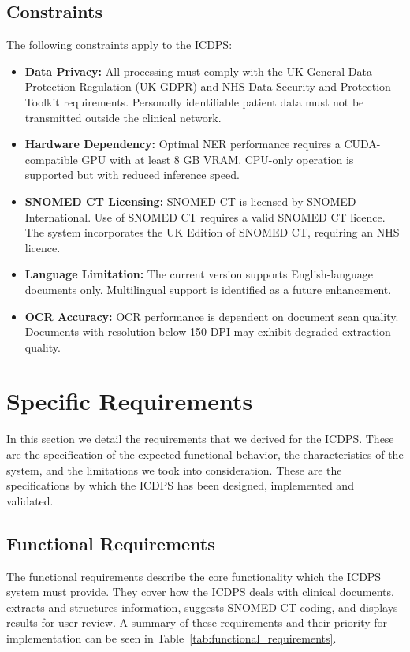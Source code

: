 \subsection{Constraints}
The following constraints apply to the ICDPS:
\begin{itemize}
    \item \textbf{Data Privacy:} All processing must comply with the UK General Data Protection Regulation (UK GDPR) and NHS Data Security and Protection Toolkit requirements. Personally identifiable patient data must not be transmitted outside the clinical network.
    \item \textbf{Hardware Dependency:} Optimal NER performance requires a CUDA-compatible GPU with at least 8 GB VRAM. CPU-only operation is supported but with reduced inference speed.
    \item \textbf{SNOMED CT Licensing:} SNOMED CT is licensed by SNOMED International. Use of SNOMED CT requires a valid SNOMED CT licence. The system incorporates the UK Edition of SNOMED CT, requiring an NHS licence.
    \item \textbf{Language Limitation:} The current version supports English-language documents only. Multilingual support is identified as a future enhancement.
    \item \textbf{OCR Accuracy:} OCR performance is dependent on document scan quality. Documents with resolution below 150 DPI may exhibit degraded extraction quality.
\end{itemize}

\section{Specific Requirements}

In this section we detail the requirements that we derived for the ICDPS. These are the specification of the expected functional behavior, the characteristics of the system, and the limitations we took into consideration. These are the specifications by which the ICDPS has been designed, implemented and validated.

\subsection{Functional Requirements}

The functional requirements describe the core functionality which the ICDPS system must provide. They cover how the ICDPS deals with clinical documents, extracts and structures information, suggests SNOMED CT coding, and displays results for user review. A summary of these requirements and their priority for implementation can be seen in Table~\ref{tab:functional_requirements}.

